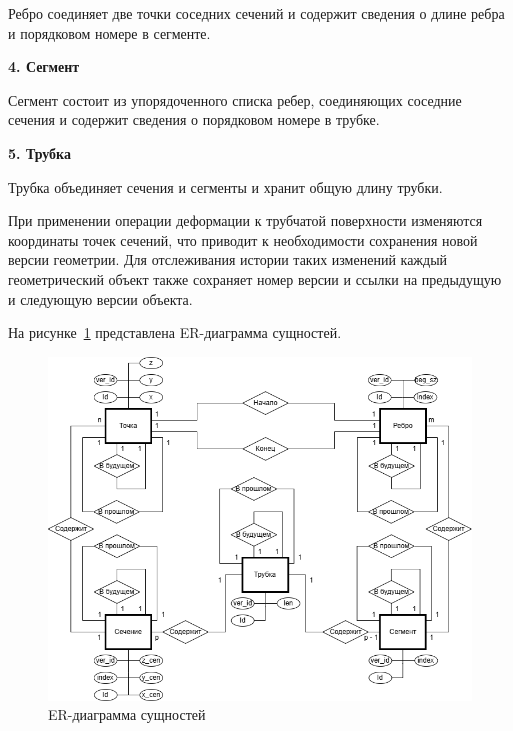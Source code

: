 \noindent
\hspace{1.25cm}
Ребро соединяет две точки соседних сечений и содержит сведения о длине ребра и порядковом номере в сегменте.

\noindent
\hspace{1.25cm}
\textbf{4. Сегмент}

\noindent
\hspace{1.25cm}
Сегмент состоит из упорядоченного списка ребер, соединяющих соседние сечения и содержит сведения о порядковом номере в трубке.

\noindent
\hspace{1.25cm}
\textbf{5. Трубка}

\noindent
\hspace{1.25cm}
Трубка объединяет сечения и сегменты и хранит общую длину трубки.

\noindent
\hspace{1.25cm}
При применении операции деформации к трубчатой поверхности изменяются координаты точек сечений, что приводит к необходимости сохранения новой версии геометрии. Для отслеживания истории таких изменений каждый геометрический объект также сохраняет номер версии и ссылки на предыдущую и следующую версии объекта.

\noindent
\hspace{1.25cm}
На рисунке~\ref{fig:er} представлена ER-диаграмма сущностей.

\begin{figure}[H]
\centering
\includegraphics[width=1.0\textwidth]{img/er.png}
\caption{ER-диаграмма сущностей}
\label{fig:er}
\end{figure}

